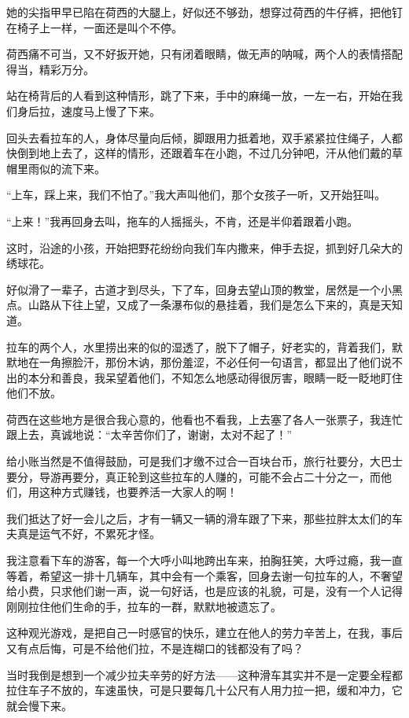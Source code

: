 \par 她的尖指甲早已陷在荷西的大腿上，好似还不够劲，想穿过荷西的牛仔裤，把他钉在椅子上一样，一面还是叫个不停。
\par 荷西痛不可当，又不好扳开她，只有闭着眼睛，做无声的呐喊，两个人的表情搭配得当，精彩万分。
\par 站在椅背后的人看到这种情形，跳了下来，手中的麻绳一放，一左一右，开始在我们身后拉，速度马上慢了下来。
\par 回头去看拉车的人，身体尽量向后倾，脚跟用力抵着地，双手紧紧拉住绳子，人都快倒到地上去了，这样的情形，还跟着车在小跑，不过几分钟吧，汗从他们戴的草帽里雨似的流下来。
\par “上车，踩上来，我们不怕了。”我大声叫他们，那个女孩子一听，又开始狂叫。
\par “上来！”我再回身去叫，拖车的人摇摇头，不肯，还是半仰着跟着小跑。
\par 这时，沿途的小孩，开始把野花纷纷向我们车内撒来，伸手去捉，抓到好几朵大的绣球花。
\par 好似滑了一辈子，古道才到尽头，下了车，回身去望山顶的教堂，居然是一个小黑点。山路从下往上望，又成了一条瀑布似的悬挂着，我们是怎么下来的，真是天知道。
\par 拉车的两个人，水里捞出来的似的湿透了，脱下了帽子，好老实的，背着我们，默默地在一角擦脸汗，那份木讷，那份羞涩，不必任何一句语言，都显出了他们说不出的本分和善良，我呆望着他们，不知怎么地感动得很厉害，眼睛一眨一眨地盯住他们不放。
\par 荷西在这些地方是很合我心意的，他看也不看我，上去塞了各人一张票子，我连忙跟上去，真诚地说：“太辛苦你们了，谢谢，太对不起了！”
\par 给小账当然是不值得鼓励，可是我们才缴不过合一百块台币，旅行社要分，大巴士要分，导游再要分，真正轮到这些拉车的人赚的，可能不会占二十分之一，而他们，用这种方式赚钱，也要养活一大家人的啊！
\par 我们抵达了好一会儿之后，才有一辆又一辆的滑车跟了下来，那些拉胖太太们的车夫真是运气不好，不累死才怪。
\par 我注意看下车的游客，每一个大呼小叫地跨出车来，拍胸狂笑，大呼过瘾，我一直等着，希望这一排十几辆车，其中会有一个乘客，回身去谢一句拉车的人，不奢望给小费，只求他们谢一声，说一句好话，也是应该的礼貌，可是，没有一个人记得刚刚拉住他们生命的手，拉车的一群，默默地被遗忘了。
\par 这种观光游戏，是把自己一时感官的快乐，建立在他人的劳力辛苦上，在我，事后又有点后悔，可是不给他们拉，不是连糊口的钱都没有了吗？
\par 当时我倒是想到一个减少拉夫辛劳的好方法——这种滑车其实并不是一定要全程都拉住车子不放的，车速虽快，可是只要每几十公尺有人用力拉一把，缓和冲力，它就会慢下来。
